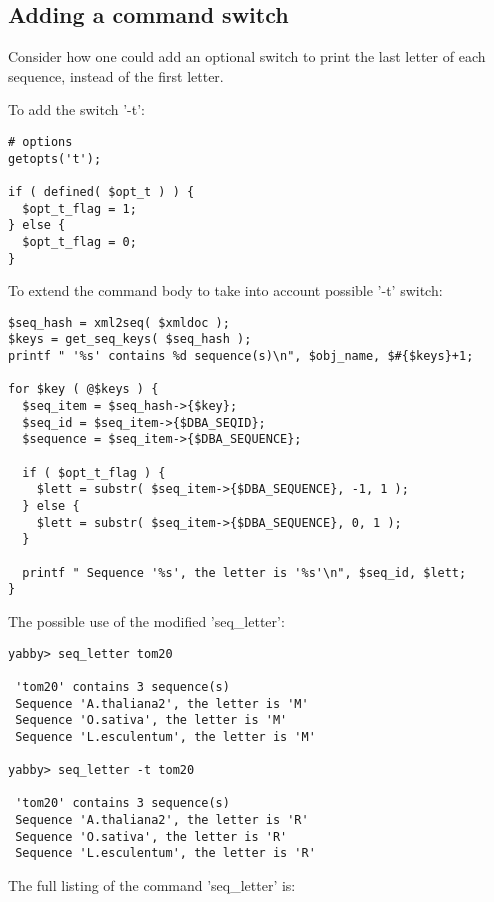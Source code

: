 \subsection{Adding a command switch}

Consider how one could add an optional switch to print the last
letter of each sequence, instead of the first letter.

To add the switch '-t':

\begin{verbatim}
# options
getopts('t');

if ( defined( $opt_t ) ) {
  $opt_t_flag = 1;
} else {
  $opt_t_flag = 0;
}
\end{verbatim}

To extend the command body to take into account possible '-t'
switch: 

\begin{verbatim}
$seq_hash = xml2seq( $xmldoc );
$keys = get_seq_keys( $seq_hash );
printf " '%s' contains %d sequence(s)\n", $obj_name, $#{$keys}+1;

for $key ( @$keys ) {
  $seq_item = $seq_hash->{$key};
  $seq_id = $seq_item->{$DBA_SEQID};
  $sequence = $seq_item->{$DBA_SEQUENCE};

  if ( $opt_t_flag ) {
    $lett = substr( $seq_item->{$DBA_SEQUENCE}, -1, 1 );
  } else {
    $lett = substr( $seq_item->{$DBA_SEQUENCE}, 0, 1 );
  }

  printf " Sequence '%s', the letter is '%s'\n", $seq_id, $lett;
}
\end{verbatim}

The possible use of the modified 'seq\_letter':

\begin{verbatim}
yabby> seq_letter tom20

 'tom20' contains 3 sequence(s)
 Sequence 'A.thaliana2', the letter is 'M'
 Sequence 'O.sativa', the letter is 'M'
 Sequence 'L.esculentum', the letter is 'M'

yabby> seq_letter -t tom20

 'tom20' contains 3 sequence(s)
 Sequence 'A.thaliana2', the letter is 'R'
 Sequence 'O.sativa', the letter is 'R'
 Sequence 'L.esculentum', the letter is 'R'
\end{verbatim}

The full listing of the command 'seq\_letter' is:


